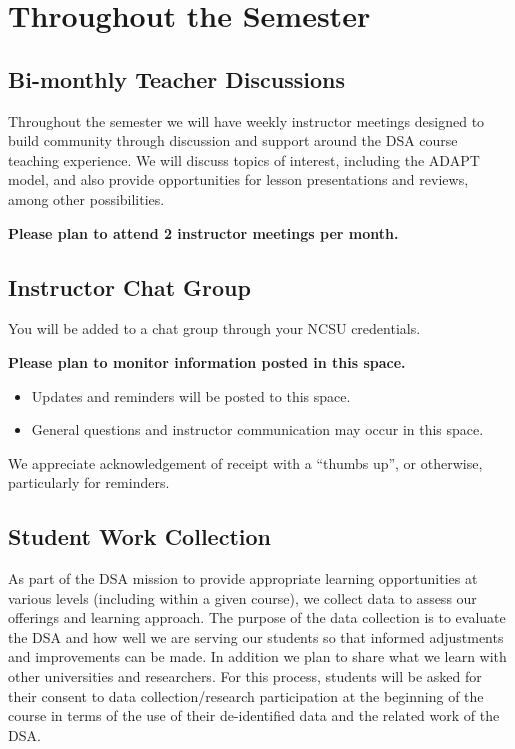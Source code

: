 \documentclass[
]{book}
\providecommand{\tightlist}{%
  \setlength{\itemsep}{0pt}\setlength{\parskip}{0pt}}
\begin{document}
\section{Throughout the Semester}\label{throughout-the-semester}

\subsection{Bi-monthly Teacher Discussions}\label{bi-monthly-teacher-discussions}

Throughout the semester we will have weekly instructor meetings designed to build community through discussion and support around the DSA course teaching experience. We will discuss topics of interest, including the ADAPT model, and also provide opportunities for lesson presentations and reviews, among other possibilities.

{ \textbf{Please plan to attend 2 instructor meetings per month.} }

\subsection{Instructor Chat Group}\label{instructor-chat-group}

You will be added to a chat group through your NCSU credentials.

{ \textbf{Please plan to monitor information posted in this space.} }

\begin{itemize}
\tightlist
\item
  Updates and reminders will be posted to this space.
\item
  General questions and instructor communication may occur in this space.
\end{itemize}

We appreciate acknowledgement of receipt with a ``thumbs up'', or otherwise, particularly for reminders.

\subsection{Student Work Collection}\label{student-work-collection}

As part of the DSA mission to provide appropriate learning opportunities at various levels (including within a given course), we collect data to assess our offerings and learning approach. The purpose of the data collection is to evaluate the DSA and how well we are serving our students so that informed adjustments and improvements can be made. In addition we plan to share what we learn with other universities and researchers. For this process, students will be asked for their consent to data collection/research participation at the beginning of the course in terms of the use of their de-identified data and the related work of the DSA.
\end{document}
